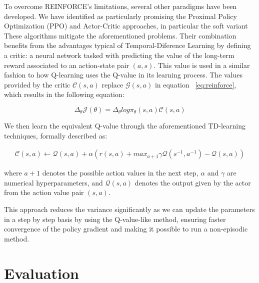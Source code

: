 To overcome REINFORCE's limitations, several other paradigms have been developed. We have identified as particularly promising the Proximal Policy Optimization (PPO)
and Actor-Critic
 approaches, in particular the soft variant
 These algorithms mitigate the aforementioned problems.
Their combination benefits from the advantages typical of Temporal-Diference Learning
 by defining a critic: a neural network tasked with predicting the value of the long-term reward associated to an action-state pair $(a,s)$. This value is used in a similar fashion to how Q-learning
 uses the Q-value in its learning process. The values provided by the critic $\mathcal{C}(s,a)$ replace $\mathcal{G}(s,a)$ in equation
~\ref{eq:reinforce}, which results in the following equation:

\begin{equation}
\label{eq:ActorCritic}
    \Delta_{\theta}\mathcal{J}(\theta) =\Delta_{\theta}log\pi_{\theta}(s,a)\mathcal{C}(s,a) 
\end{equation}

We then learn the equivalent Q-value through the aforementioned TD-learning techniques, formally described as:

\begin{equation}
\label{eq:TemporalDifference}
\begin{split}
    \mathcal{C}(s,a) \gets \mathcal{Q}(s,a) + \alpha(r(s,a) + max_{a+1} \gamma \mathcal{Q}(s^{-1},a^{-1}) - \mathcal{Q}(s,a))
\end{split}
\end{equation}

where $a+1$ denotes the possible action values in the next step, $\alpha$ and $\gamma$ are numerical hyperparameters, and $\mathcal{Q}(s,a)$ denotes the output given by the actor from the action value pair $(s,a)$.

This approach reduces the variance significantly as we can update the parameters in a step by step basis by using the Q-value-like method, ensuring faster convergence of the policy gradient and making it possible to run a non-episodic method.


\section{Evaluation}\label{sec:spacerl-evaluation}



